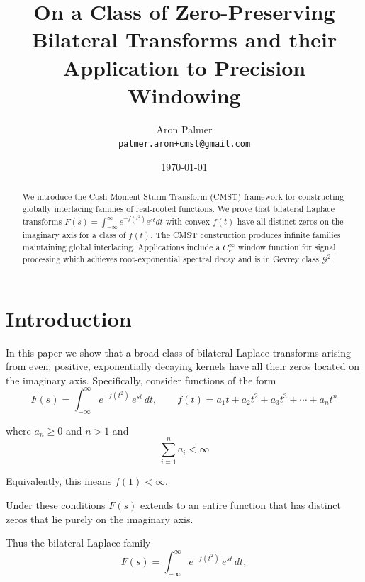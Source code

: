\documentclass[11pt]{article}
\theoremstyle{breakdef}
\begin{document}
\title{On a Class of Zero-Preserving Bilateral Transforms and their Application to Precision Windowing}
\author{Aron Palmer\\ \small \texttt{palmer.aron+cmst@gmail.com}}
\date{\today}
\maketitle
\thispagestyle{preprint} 

\begin{abstract}
We introduce the Cosh Moment Sturm Transform (CMST) framework for constructing 
globally interlacing families of real-rooted functions. We prove that bilateral 
Laplace transforms $F(s) = \int_{-\infty}^{\infty} e^{-f(t^2)} e^{st} dt$ 
with convex $f(t)$ have all distinct zeros on the imaginary axis for a class of $f(t)$. The CMST 
construction produces infinite families maintaining global interlacing.
Applications include a $C_c^{\infty}$ window function for signal processing 
which  achieves root-exponential spectral decay and is in Gevrey class $\mathcal{G}^2$.

\end{abstract}

\section{Introduction}

In this paper we show that a broad class of bilateral Laplace transforms arising from 
even, positive, exponentially decaying kernels have all their zeros located on the 
imaginary axis.  Specifically, consider functions of the form
\begin{equation}
F(s)=\int_{-\infty}^{\infty} e^{-f(t^{2})}\,e^{s t}\,dt,
\qquad 
f(t)=a_{1}t+a_{2}t^{2}+a_{3}t^{3}+\cdots+a_{n}t^{n}
\end{equation}

where $a_{n} \ge 0 $ and $n>1$ and 
\[
\sum_{i=1}^{n} a_i < \infty
\]

Equivalently, this means $f(1) < \infty$. \newline

Under these conditions $F(s)$ extends to an entire function that has distinct zeros that lie purely on the imaginary axis. \newline

Thus the bilateral Laplace family
\begin{equation}
F(s)=\int_{-\infty}^{\infty} e^{-f(t^{2})}\,e^{s t}\,dt,
\end{equation}
\end{document}
